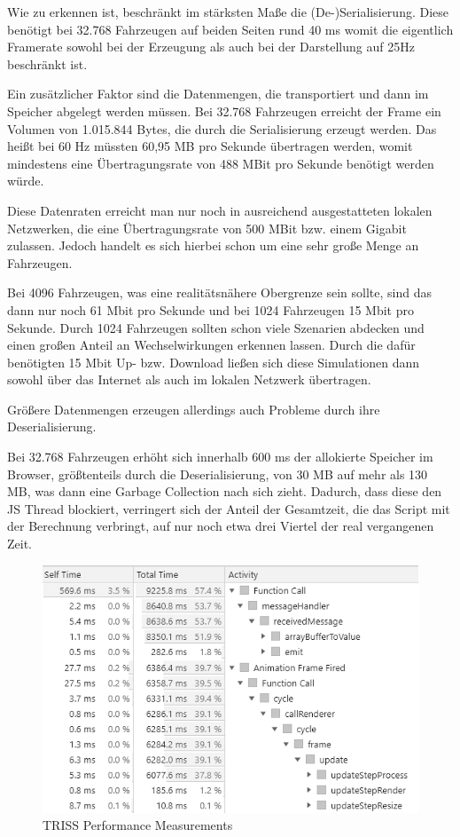 Wie zu erkennen ist, beschränkt im stärksten Maße die (De-)Serialisierung.
Diese benötigt bei 32.768 Fahrzeugen auf beiden Seiten rund 40 ms womit die eigentlich Framerate sowohl bei der Erzeugung als auch bei der Darstellung auf 25Hz beschränkt ist.

Ein zusätzlicher Faktor sind die Datenmengen, die transportiert und dann im Speicher abgelegt werden müssen.
Bei 32.768 Fahrzeugen erreicht der Frame ein Volumen von 1.015.844 Bytes, die durch die Serialisierung erzeugt werden.
Das heißt bei 60 Hz müssten 60,95 MB pro Sekunde übertragen werden, womit mindestens eine Übertragungsrate von 488 MBit pro Sekunde benötigt werden würde.

Diese Datenraten erreicht man nur noch in ausreichend ausgestatteten lokalen Netzwerken, die eine Übertragungsrate von 500 MBit bzw. einem Gigabit zulassen.
Jedoch handelt es sich hierbei schon um eine sehr große Menge an Fahrzeugen.

Bei 4096 Fahrzeugen, was eine realitätsnähere Obergrenze sein sollte, sind das dann nur noch 61 Mbit pro Sekunde und bei 1024 Fahrzeugen 15 Mbit pro Sekunde.
Durch 1024 Fahrzeugen sollten schon viele Szenarien abdecken und einen großen Anteil an Wechselwirkungen erkennen lassen.
Durch die dafür benötigten 15 Mbit Up- bzw. Download ließen sich diese Simulationen dann sowohl über das Internet als auch im lokalen Netzwerk übertragen.

Größere Datenmengen erzeugen allerdings auch Probleme durch ihre Deserialisierung.

Bei 32.768 Fahrzeugen erhöht sich innerhalb 600 ms der allokierte Speicher im Browser, größtenteils durch die Deserialisierung, von 30 MB auf mehr als 130 MB, was dann eine Garbage Collection nach sich zieht.
Dadurch, dass diese den JS Thread blockiert, verringert sich der Anteil der Gesamtzeit, die das Script mit der Berechnung verbringt, auf nur noch etwa drei Viertel der real vergangenen Zeit.

\begin{figure}[htb]
    \centering
    \includegraphics[scale=0.5,center]{medien/triss-perf.png}
    \caption{TRISS Performance Measurements}
    \ownsource
    \label{fig:triss-performance}
\end{figure}

